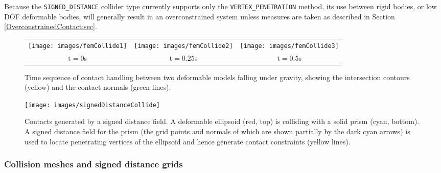 \begin{description}
\begin{sideblock}
Because the {\tt SIGNED\_DISTANCE} collider type currently supports
only the {\tt VERTEX\_PENETRATION} method, its use between rigid
bodies, or low DOF deformable bodies, will generally result in an
overconstrained system unless measures are taken as described in
Section \ref{OverconstrainedContact:sec}.
\end{sideblock}

\end{description}

\begin{figure}[ht]
\begin{center}
        \begin{tabular}{ccc}
        \texttt{[image: images/femCollide1]} &
        \texttt{[image: images/femCollide2]} &
        \texttt{[image: images/femCollide3]}\\
         \large  $\mathrm{t}=0$s & \large $\mathrm{t}=0.25$s & \large $\mathrm{t}=0.5$s         
        \end{tabular}
\end{center}
\caption{Time sequence of contact handling between two deformable models 
falling under gravity, 
showing the intersection contours
(yellow) and the contact normals (green lines).}
\label{Collision:fig}
\end{figure}

\begin{figure}[ht]
\begin{center}
     \texttt{[image: images/signedDistanceCollide]}
\end{center}
\caption{Contacts generated by a signed distance field. A deformable
ellipsoid (red, top) is colliding with a solid prism (cyan, bottom).
A signed distance field for the prism (the grid points and normals of
which are shown partially by the dark cyan arrows) is used to locate
penetrating vertices of the ellipsoid and hence generate contact
constraints (yellow lines).}
\label{SDCollision:fig}
\end{figure}

\subsubsection{Collision meshes and signed distance grids}
\label{collisionMeshes:sec}

